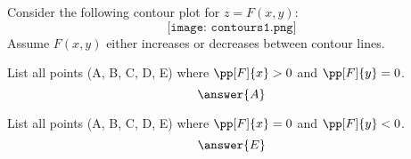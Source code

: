 \documentclass{ximera}
\author{Bart Snapp}
\begin{document}
\begin{exercise}
Consider the following contour plot for $z=F(x,y)$:
\[
\texttt{[image: contours1.png]}
\]
Assume $F(x,y)$ either increases or decreases between contour lines.

List all points (\textsf{A}, \textsf{B}, \textsf{C}, \textsf{D},
\textsf{E}) where $\pp[F]{x}>0$ and $\pp[F]{y}=0$.
\[
\answer{A}
\]

  
List all points (\textsf{A}, \textsf{B}, \textsf{C}, \textsf{D},
\textsf{E}) where $\pp[F]{x}=0$ and $\pp[F]{y}<0$.
\[
\answer{E}
\]
\end{exercise}
\end{document}
